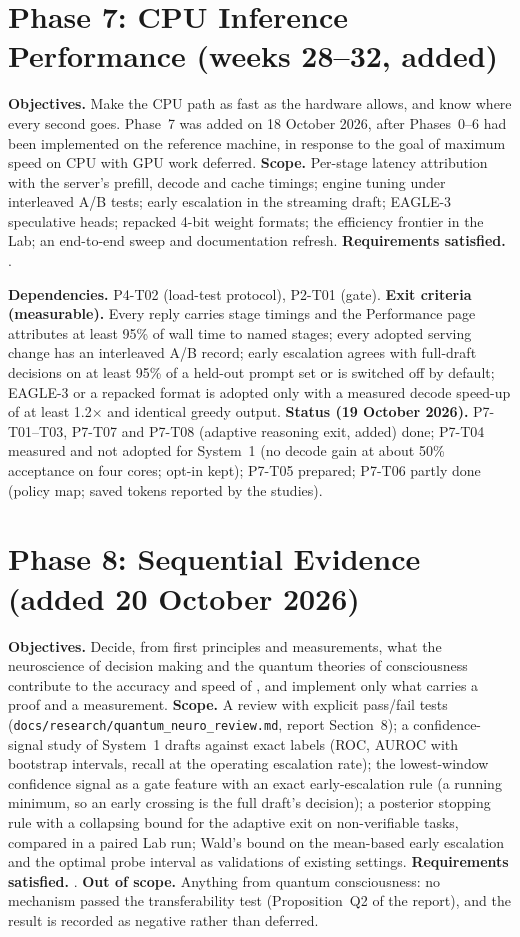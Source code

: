 \documentclass[11pt,a4paper]{article}
\begin{document}
\section{Phase 7: CPU Inference Performance (weeks 28--32, added)}
\textbf{Objectives.} Make the CPU path as fast as the hardware allows, and know where every second goes. Phase~7 was added on 18 October 2026, after Phases~0--6 had been implemented on the reference machine, in response to the goal of maximum speed on CPU with GPU work deferred. \textbf{Scope.} Per-stage latency attribution with the server's prefill, decode and cache timings; engine tuning under interleaved A/B tests; early escalation in the streaming draft; EAGLE-3 speculative heads; repacked 4-bit weight formats; the efficiency frontier in the Lab; an end-to-end sweep and documentation refresh. \textbf{Requirements satisfied.} \ReqsPhaseH.
\par\medskip\noindent\TasksPhaseH
\par\medskip\noindent\textbf{Dependencies.} P4-T02 (load-test protocol), P2-T01 (gate). \textbf{Exit criteria (measurable).} Every reply carries stage timings and the Performance page attributes at least 95\% of wall time to named stages; every adopted serving change has an interleaved A/B record; early escalation agrees with full-draft decisions on at least 95\% of a held-out prompt set or is switched off by default; EAGLE-3 or a repacked format is adopted only with a measured decode speed-up of at least 1.2$\times$ and identical greedy output. \textbf{Status (19 October 2026).} P7-T01--T03, P7-T07 and P7-T08 (adaptive reasoning exit, added) done; P7-T04 measured and not adopted for System~1 (no decode gain at about 50\% acceptance on four cores; opt-in kept); P7-T05 prepared; P7-T06 partly done (policy map; saved tokens reported by the studies).

\section{Phase 8: Sequential Evidence (added 20 October 2026)}
\textbf{Objectives.} Decide, from first principles and measurements, what the neuroscience of decision making and the quantum theories of consciousness contribute to the accuracy and speed of \Sys, and implement only what carries a proof and a measurement. \textbf{Scope.} A review with explicit pass/fail tests (\texttt{docs/research/quantum\_neuro\_review.md}, report Section~8); a confidence-signal study of System~1 drafts against exact labels (ROC, AUROC with bootstrap intervals, recall at the operating escalation rate); the lowest-window confidence signal as a gate feature with an exact early-escalation rule (a running minimum, so an early crossing is the full draft's decision); a posterior stopping rule with a collapsing bound for the adaptive exit on non-verifiable tasks, compared in a paired Lab run; Wald's bound on the mean-based early escalation and the optimal probe interval as validations of existing settings. \textbf{Requirements satisfied.} \ReqsPhaseI. \textbf{Out of scope.} Anything from quantum consciousness: no mechanism passed the transferability test (Proposition~Q2 of the report), and the result is recorded as negative rather than deferred.
\end{document}
